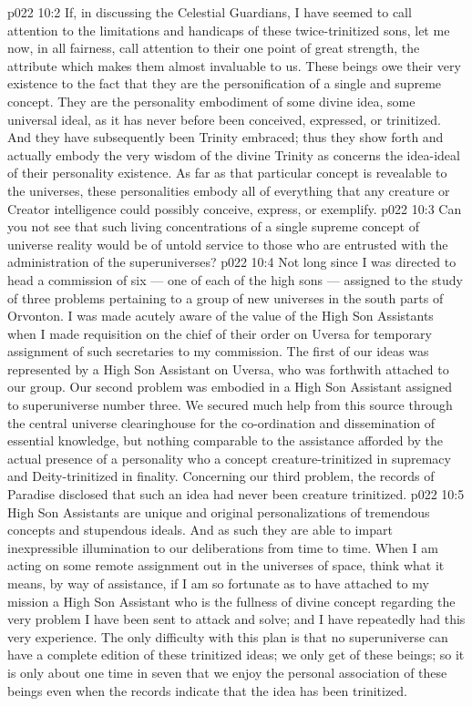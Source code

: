 \vs p022 10:2 \pc If, in discussing the Celestial Guardians, I have seemed to call attention to the limitations and handicaps of these twice\hyp{}trinitized sons, let me now, in all fairness, call attention to their one point of great strength, the attribute which makes them almost invaluable to us. These beings owe their very existence to the fact that they are the personification of a single and supreme concept. They are the personality embodiment of some divine idea, some universal ideal, as it has never before been conceived, expressed, or trinitized. And they have subsequently been Trinity embraced; thus they show forth and actually embody the very wisdom of the divine Trinity as concerns the idea\hyp{}ideal of their personality existence. As far as that particular concept is revealable to the universes, these personalities embody all of everything that any creature or Creator intelligence could possibly conceive, express, or exemplify. 
\vs p022 10:3 Can you not see that such living concentrations of a single supreme concept of universe reality would be of untold service to those who are entrusted with the administration of the superuniverses?
\vs p022 10:4 \pc Not long since I was directed to head a commission of six --- one of each of the high sons --- assigned to the study of three problems pertaining to a group of new universes in the south parts of Orvonton. I was made acutely aware of the value of the High Son Assistants when I made requisition on the chief of their order on Uversa for temporary assignment of such secretaries to my commission. The first of our ideas was represented by a High Son Assistant on Uversa, who was forthwith attached to our group. Our second problem was embodied in a High Son Assistant assigned to superuniverse number three. We secured much help from this source through the central universe clearinghouse for the co\hyp{}ordination and dissemination of essential knowledge, but nothing comparable to the assistance afforded by the actual presence of a personality who  a concept creature\hyp{}trinitized in supremacy and Deity\hyp{}trinitized in finality. Concerning our third problem, the records of Paradise disclosed that such an idea had never been creature trinitized.
\vs p022 10:5 \pc High Son Assistants are unique and original personalizations of tremendous concepts and stupendous ideals. And as such they are able to impart inexpressible illumination to our deliberations from time to time. When I am acting on some remote assignment out in the universes of space, think what it means, by way of assistance, if I am so fortunate as to have attached to my mission a High Son Assistant who is the fullness of divine concept regarding the very problem I have been sent to attack and solve; and I have repeatedly had this very experience. The only difficulty with this plan is that no superuniverse can have a complete edition of these trinitized ideas; we only get  of these beings; so it is only about one time in seven that we enjoy the personal association of these beings even when the records indicate that the idea has been trinitized.
